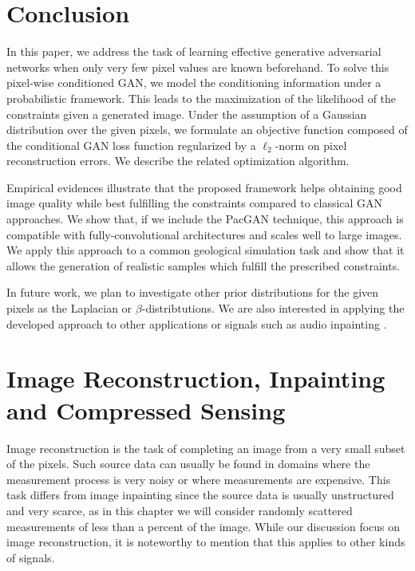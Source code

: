 \section*{Conclusion}
In this paper, we address the task of learning effective generative adversarial networks when only very few pixel values are known beforehand. To solve this pixel-wise conditioned GAN, we model the conditioning information under a probabilistic framework. This leads to the maximization of the likelihood of the constraints given a
generated image. Under the assumption of a Gaussian distribution over the given pixels, we formulate an objective function composed of the conditional GAN loss function regularized by a $\ell_2$-norm on pixel reconstruction errors. We describe the related optimization algorithm.

Empirical evidences illustrate that the proposed framework helps obtaining good image quality while best fulfilling the constraints compared to classical GAN approaches. We show that, if we include the PacGAN technique,  this  approach  is  compatible  with  fully-convolutional  architectures  and scales well to large images. We apply this approach to a common geological simulation task and show that it allows the generation of realistic samples which fulfill the prescribed constraints.

In future work, we plan to investigate other prior distributions for the given pixels as the Laplacian or $\beta$-distribtutions. We are also interested in applying the developed approach to other applications or signals such as audio inpainting \cite{marafioti2018context}.






 \section{Image Reconstruction, Inpainting and Compressed Sensing}

Image reconstruction is the task of completing an image from a very small subset of the pixels. Such source data can usually be found in domains where the measurement process is very noisy or where measurements are expensive. This task differs from image inpainting since the source data is usually unstructured and very scarce, as in this chapter we will consider randomly scattered measurements of less than a percent of the image. While our discussion focus on image reconstruction, it is noteworthy to mention that this applies to other kinds of signals.

